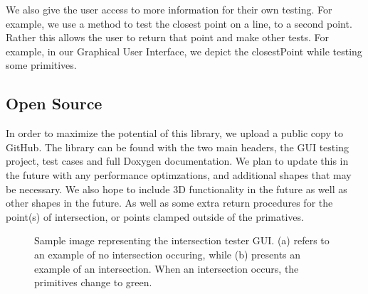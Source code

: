 We also give the user access to more information for their own testing. For example, we use a method to test the closest point on a line, to a second point. Rather this allows the user to return that point and make other tests. For example, in our Graphical User Interface, we depict the closestPoint while testing some primitives.



\subsection{Open Source}
In order to maximize the potential of this library, we upload a public copy to GitHub. The library can be found with the two main headers, the GUI testing project, test cases and full Doxygen documentation. We plan to update this in the future with any performance optimzations, and additional shapes that may be necessary. We also hope to include 3D functionality in the future as well as other shapes in the future. As well as some extra return procedures for the point(s) of intersection, or points clamped outside of the primatives.

\begin{figure}[t]
\caption{Sample image representing the intersection tester GUI. (a) refers to an example of no intersection occuring, while (b) presents an example of an intersection. When an intersection occurs, the primitives change to green.} \label{fig:inter}
\end{figure}


